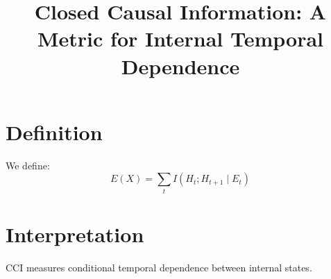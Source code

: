 \documentclass{article}
\title{Closed Causal Information: A Metric for Internal Temporal Dependence}
\begin{document}
\maketitle

\section{Definition}

We define:
\[
E(X) = \sum_t I(H_t ; H_{t+1} \mid E_t)
\]

\section{Interpretation}

CCI measures conditional temporal dependence between internal states.
\end{document}
